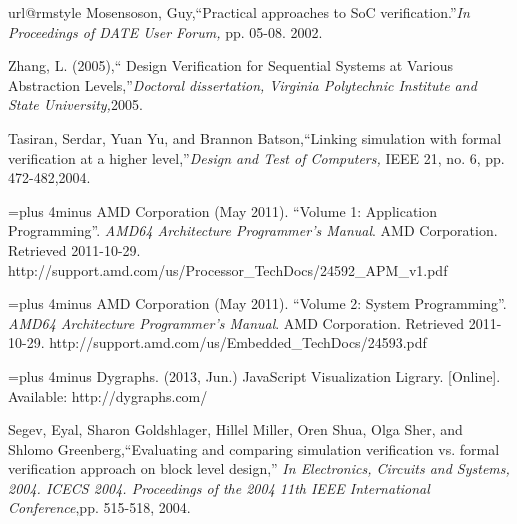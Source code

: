 \begin{thebibliography}{10}
\providecommand{\url}[1]{#1}
\csname url@rmstyle\endcsname
\providecommand{\newblock}{\relax}
\providecommand{\bibinfo}[2]{#2}
\providecommand\BIBentrySTDinterwordspacing{\spaceskip=0pt\relax}
\providecommand\BIBentryALTinterwordstretchfactor{4}
\providecommand\BIBentryALTinterwordspacing{\spaceskip=\fontdimen2\font plus
\BIBentryALTinterwordstretchfactor\fontdimen3\font minus
  \fontdimen4\font\relax}
\providecommand\BIBforeignlanguage[2]{{%
\expandafter\ifx\csname l@#1\endcsname\relax
\typeout{** WARNING: IEEEtran.bst: No hyphenation pattern has been}%
\typeout{** loaded for the language `#1'. Using the pattern for}%
\typeout{** the default language instead.}%
\else
\language=\csname l@#1\endcsname
\fi
#2}}
Mosensoson, Guy,``Practical approaches to SoC verification.''\emph{In Proceedings of DATE User Forum,} pp. 05-08. 2002.

Zhang, L. (2005),`` Design Verification for Sequential Systems at Various Abstraction Levels,''\emph{Doctoral dissertation, Virginia Polytechnic Institute and State University,}2005.

Tasiran, Serdar, Yuan Yu, and Brannon Batson,``Linking simulation with formal verification at a higher level,''\emph{Design and Test of Computers,} IEEE 21, no. 6, pp. 472-482,2004.

\BIBentryALTinterwordspacing
AMD Corporation (May 2011). ``Volume 1: Application Programming''. \emph{AMD64 Architecture Programmer's Manual}. AMD Corporation. Retrieved 2011-10-29.
\url{http://support.amd.com/us/Processor_TechDocs/24592_APM_v1.pdf}
\BIBentrySTDinterwordspacing
 
\BIBentryALTinterwordspacing
AMD Corporation (May 2011). ``Volume 2: System Programming''. \emph{AMD64 Architecture Programmer's Manual}. AMD Corporation. Retrieved 2011-10-29.
\url{http://support.amd.com/us/Embedded_TechDocs/24593.pdf}
\BIBentrySTDinterwordspacing
 
\BIBentryALTinterwordspacing
Dygraphs. (2013, Jun.) {JavaScript Visualization Ligrary}. [Online]. Available:
  \url{http://dygraphs.com/}
\BIBentrySTDinterwordspacing


Segev, Eyal, Sharon Goldshlager, Hillel Miller, Oren Shua, Olga Sher, and Shlomo Greenberg,``Evaluating and comparing simulation verification vs. formal verification approach on block level design,'' \emph{In Electronics, Circuits and Systems, 2004. ICECS 2004. Proceedings of the 2004 11th IEEE International Conference},pp. 515-518, 2004.



\end{thebibliography}
